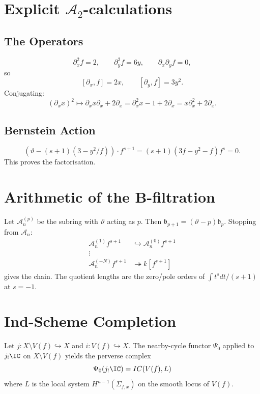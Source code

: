 \documentclass[12pt]{article}
\theoremstyle{plain}
\theoremstyle{remark}
\newcommand{\A}{\mathcal{A}}
\newcommand{\bF}{\mathfrak{b}}
\newcommand{\vertF}{\vartheta}
\newcommand{\Nearby}{\Psi}
\begin{document}
\section{Explicit $\A_2$-calculations}

\subsection{The Operators}
\[
  \partial_x^2 f   = 2,\qquad
  \partial_y^2 f   = 6y,\qquad
  \partial_x\partial_y f = 0,
\]
so
\[
  [\partial_x, f] = 2x,\qquad
  [\partial_y, f] = 3y^2.
\]
Conjugating:
\[
  (\partial_x x)^2 \mapsto \partial_x x \partial_x + 2\partial_x
                         = \partial_x^2 x - 1 + 2\partial_x
  = x\partial_x^2 + 2\partial_x.
\]

\subsection{Bernstein Action}
\[
  (\vertF - (s+1)(3-y^2/f)) \cdot f^{s+1}
  = (s+1)(3f-y^2 - f)f^s = 0.
\]
This proves the factorisation.

\section{Arithmetic of the B-filtration}

Let $\A_n^{(p)}$ be the subring with $\vertF$ acting as $p$.
Then $\bF_{p+1} = (\vertF-p) \bF_p$.
Stopping from $\A_n$:
\begin{align*}
  \A_n^{(1)} f^{s+1} & \hookrightarrow \A_n^{(0)} f^{s+1} \\
  \vdots \\
  \A_n^{(-N)} f^{s+1} & \twoheadrightarrow k[f^{s+1}]
\end{align*}
gives the chain. The quotient lengths are the zero/pole orders
of $\int t^{s}dt/(s+1)$ at $s=-1$.

\section{Ind-Scheme Completion}

Let $j: X \setminus V(f) \hookrightarrow X$ and
$i: V(f) \hookrightarrow X$. The nearby-cycle functor
$\Nearby_0$ applied to $j_!\IC$ on $X\setminus V(f)$ yields
the perverse complex
\[ \Nearby_0(j_!\IC) = IC(V(f), L) \]
where $L$ is the local system $H^{n-1}(\Sigma_{f,x})$ on the
smooth locus of $V(f)$.
\end{document}
